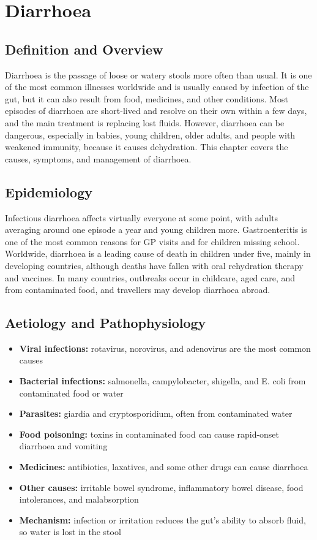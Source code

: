 \chapter{Diarrhoea}

\section*{Definition and Overview}
Diarrhoea is the passage of loose or watery stools more often than usual. It is one of the most common illnesses worldwide and is usually caused by infection of the gut, but it can also result from food, medicines, and other conditions. Most episodes of diarrhoea are short-lived and resolve on their own within a few days, and the main treatment is replacing lost fluids. However, diarrhoea can be dangerous, especially in babies, young children, older adults, and people with weakened immunity, because it causes dehydration. This chapter covers the causes, symptoms, and management of diarrhoea.

\section*{Epidemiology}
Infectious diarrhoea affects virtually everyone at some point, with adults averaging around one episode a year and young children more. Gastroenteritis is one of the most common reasons for GP visits and for children missing school. Worldwide, diarrhoea is a leading cause of death in children under five, mainly in developing countries, although deaths have fallen with oral rehydration therapy and vaccines. In many countries, outbreaks occur in childcare, aged care, and from contaminated food, and travellers may develop diarrhoea abroad.

\section*{Aetiology and Pathophysiology}
\begin{itemize}
    \item \textbf{Viral infections:} rotavirus, norovirus, and adenovirus are the most common causes
    \item \textbf{Bacterial infections:} salmonella, campylobacter, shigella, and E. coli from contaminated food or water
    \item \textbf{Parasites:} giardia and cryptosporidium, often from contaminated water
    \item \textbf{Food poisoning:} toxins in contaminated food can cause rapid-onset diarrhoea and vomiting
    \item \textbf{Medicines:} antibiotics, laxatives, and some other drugs can cause diarrhoea
    \item \textbf{Other causes:} irritable bowel syndrome, inflammatory bowel disease, food intolerances, and malabsorption
    \item \textbf{Mechanism:} infection or irritation reduces the gut's ability to absorb fluid, so water is lost in the stool
\end{itemize}

